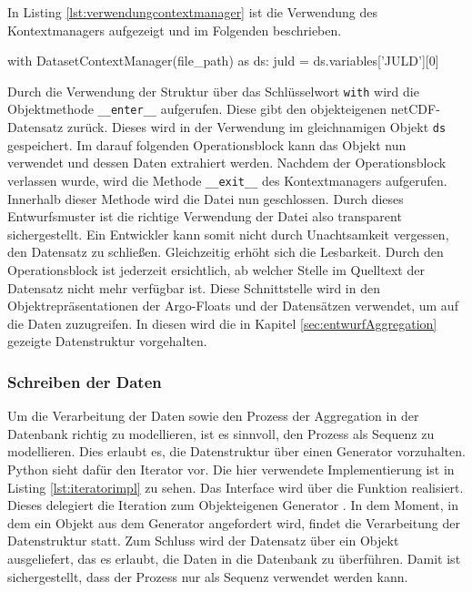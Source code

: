 In Listing \ref{lst:verwendungcontextmanager} ist die Verwendung des Kontextmanagers aufgezeigt und im Folgenden beschrieben.

\begin{python}[%
caption={Die Verwendung des Kontextmanagers},%
label={lst:verwendungcontextmanager}]
with DatasetContextManager(file_path) as ds:
    juld = ds.variables['JULD'][0]
\end{python}


Durch die Verwendung der Struktur über das Schlüsselwort \texttt{with} wird die Objektmethode \texttt{\_\_enter\_\_} aufgerufen. Diese gibt den objekteigenen \gls{netCDF}-Datensatz zurück. Dieses wird in der Verwendung im gleichnamigen Objekt \texttt{ds} gespeichert. Im darauf folgenden Operationsblock kann das Objekt nun verwendet und dessen Daten extrahiert werden. Nachdem der Operationsblock verlassen wurde, wird die Methode \texttt{\_\_exit\_\_} des Kontextmanagers aufgerufen. Innerhalb dieser Methode wird die Datei nun geschlossen.  Durch dieses Entwurfsmuster ist die richtige Verwendung der Datei also transparent sichergestellt. Ein Entwickler kann somit nicht durch Unachtsamkeit vergessen, den Datensatz zu schließen. Gleichzeitig erhöht sich die Lesbarkeit. Durch den Operationsblock ist jederzeit ersichtlich, ab welcher Stelle im Quelltext der Datensatz nicht mehr verfügbar ist.
Diese Schnittstelle wird in den Objektrepräsentationen der Argo-Floats und der Datensätzen verwendet, um auf die Daten zuzugreifen. In diesen wird die in Kapitel \ref{sec:entwurfAggregation} gezeigte Datenstruktur vorgehalten.


\subsubsection{Schreiben der Daten}

Um die Verarbeitung der Daten sowie den Prozess der Aggregation in der Datenbank richtig zu modellieren, ist es sinnvoll, den Prozess als Sequenz zu modellieren. Dies erlaubt es, die Datenstruktur über einen Generator vorzuhalten. Python sieht dafür den Iterator vor.
Die hier verwendete Implementierung ist in Listing \ref{lst:iteratorimpl} zu sehen. Das Interface wird über die Funktion  realisiert.
Dieses delegiert die Iteration zum Objekteigenen Generator . In dem Moment, in dem ein Objekt aus dem Generator angefordert wird, findet die Verarbeitung der Datenstruktur statt.
Zum Schluss wird der Datensatz über ein Objekt ausgeliefert, das es erlaubt, die Daten in die Datenbank zu überführen.
Damit ist sichergestellt, dass der Prozess nur als Sequenz verwendet werden kann.

